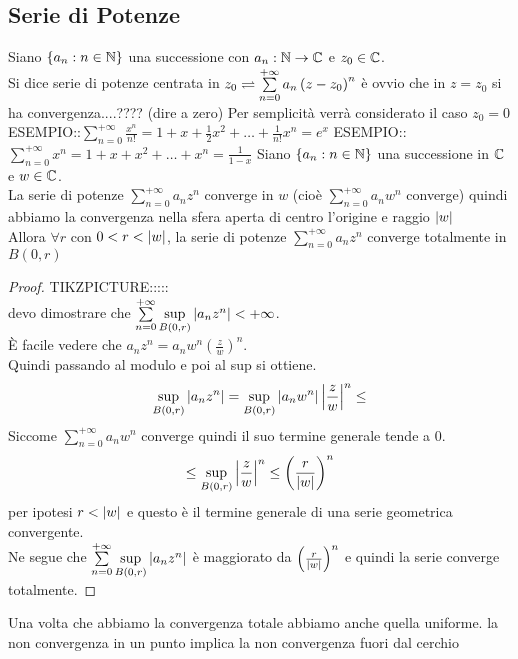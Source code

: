 \subsection{Serie di Potenze}
\begin{exercise} %
	\label{ex:conv_ser_piu_var}
\end{exercise}
Siano $\left\{a_n:n\in\mathbb{N}\right\}$ una successione con $a_n:\mathbb{N}\to\mathbb{C}$ e $z_0\in\mathbb{C}$.\\
Si dice serie di potenze centrata in $z_0 \rightleftharpoons \sum\limits_{n=0}^{+\infty}a_n\left(z-z_0\right)^n$
\observation
è ovvio che in $z=z_0$ si ha convergenza....???? (dire a zero)
\observation
Per semplicità verrà considerato il caso $z_0=0$
ESEMPIO::$\sum\limits_{n=0}^{+\infty}\frac{x^n}{n!}=1+x+\frac{1}{2} x^2+\ldots+\frac{1}{n!}x^n=e^x$
ESEMPIO::$\sum\limits_{n=0}^{+\infty}x^n=1+x+x^2+\ldots+x^n=\frac{1}{1-x}$
\proposition
Siano $\left\{a_n:n\in\mathbb{N}\right\}$ una successione in $\mathbb{C}$ e $w\in\mathbb{C}$.\\
La serie di potenze $\sum\limits_{n=0}^{+\infty}a_nz^n$ converge in $w$ (cioè $\sum\limits_{n=0}^{+\infty}a_nw^n$ converge) quindi abbiamo la convergenza nella sfera aperta di centro l'origine e raggio $\left|w\right|$\\
Allora $\forall r$ con $0<r<\left|w\right|$, la serie di potenze $\sum\limits_{n=0}^{+\infty}a_nz^n$ converge totalmente in $B(0,r)$
\begin{proof}
	TIKZPICTURE:::::\\
	devo dimostrare che $\sum\limits_{n=0}^{+\infty}\sup\limits_{B(0,r)}\left|a_nz^n\right|<+\infty$.\\
	È facile vedere che $a_nz^n=a_nw^n\left(\frac{z}{w}\right)^n$.\\
	Quindi passando al modulo e poi al sup si ottiene.
	\[\sup\limits_{B(0,r)}\left|a_nz^n\right|=\sup\limits_{B(0,r)}\left|a_nw^n\right|\left|\frac{z}{w}\right|^n \leq \]
	Siccome $\sum\limits_{n=0}^{+\infty}a_nw^n$ converge  quindi il suo termine generale tende a $0$.
	\[ \leq \sup\limits_{B(0,r)}\left|\frac{z}{w}\right|^n \leq \left(\frac{r}{\left|w\right|}\right)^n \]
	per ipotesi $r<\left|w\right|$ e questo è il termine generale di una serie geometrica convergente.\\
	Ne segue che $\sum\limits_{n=0}^{+\infty}\sup\limits_{B(0,r)}\left|a_nz^n\right|$ è maggiorato da $\left( \frac{r}{\left|w\right|}\right)^n$ e quindi la serie converge totalmente.
\end{proof}
\observation
Una volta che abbiamo la convergenza totale abbiamo anche quella uniforme.
\proposition la non convergenza in un punto implica la non convergenza fuori dal cerchio\\
